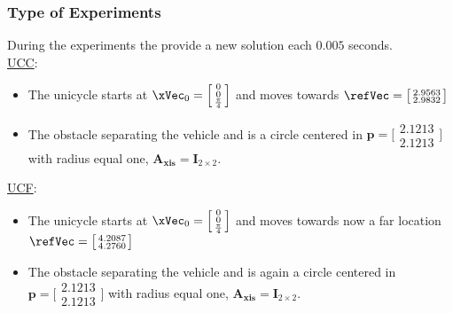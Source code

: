 \subsubsection{Type of Experiments}
\label{subsubsec:unicyle_type_of_experiments}


During the experiments the  provide a new solution each \(0.005\) seconds.\\


\underline{UCC}:
\label{ssssec:UCC} %
\begin{itemize}
  \item The unicycle starts at \(\xVec_0 = \Bigl[\begin{smallmatrix} 0 \\ 0 \\ \frac{\pi}{4}  \end{smallmatrix}\Bigr]\) and moves towards \(\refVec = \bigl[\begin{smallmatrix} 2.9563 \\ 2.9832 \end{smallmatrix}\bigr]\)
  \item The obstacle separating the vehicle and \txtref is a circle centered in \(\mathbf{p} = \bigl[\begin{smallmatrix} 2.1213 \\ 2.1213 \end{smallmatrix}\bigr] \) with radius equal one, \(\mathbf{A_{xis}} = \mathbf{I}_{2 \times 2}\).
\end{itemize}

\underline{UCF}:
\label{ssssec:UCF} %
\begin{itemize}
  \item The unicycle starts at \(\xVec_0 = \Bigl[\begin{smallmatrix} 0 \\ 0 \\ \frac{\pi}{4}  \end{smallmatrix}\Bigr]\) and moves towards now a far location \(\refVec = \bigl[\begin{smallmatrix} 4.2087 \\ 4.2760 \end{smallmatrix}\bigr]\)
  \item The obstacle separating the vehicle and \txtref is again a circle centered in \(\mathbf{p} = \bigl[\begin{smallmatrix} 2.1213 \\ 2.1213 \end{smallmatrix}\bigr] \) with radius equal one, \(\mathbf{A_{xis}} = \mathbf{I}_{2 \times 2}\).
\end{itemize}

